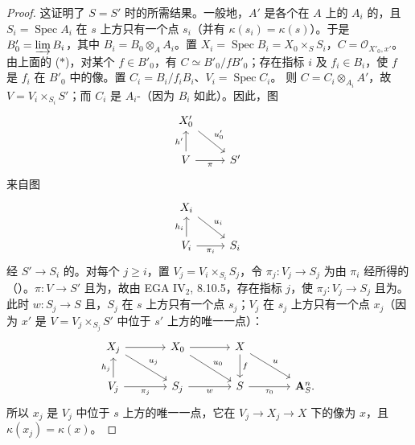 \begin{proof}
这证明了 $S=S'$ 时的所需结果。一般地，$A'$ 是各个在 $A$ 上的 $A_i$ 的，且 $S_i=\operatorname{Spec}A_i$ 在 $s$ 上方只有一个点 $s_i$（并有 $\kappa(s_i)=\kappa(s)$）。于是 $B'_0=\varinjlim B_i$，其中 $B_i=B_0\otimes_AA_i$。置 $X_i=\operatorname{Spec}B_i=X_0\times_SS_i$，$C=\mathcal O_{X'_0,x'}$。由上面的 ($*$)，对某个 $f\in B'_0$，有 $C\simeq B'_0/fB'_0$；存在指标 $i$ 及 $f_i\in B_i$，使 $f$ 是 $f_i$ 在 $B'_0$ 中的像。置 $C_i=B_i/f_iB_i$、$V_i=\operatorname{Spec}C_i$。
则 $C=C_i\otimes_{A_i}A'$，故 $V=V_i\times_{S_i}S'$；而 $C_i$ 是 $A_i$-（因为 $B_i$ 如此）。因此，图
\[
\begin{tikzcd}
X'_0\arrow[dr,"u'_0"]&\\
V\arrow[u,"h'"]\arrow[r,"\pi"']&S'
\end{tikzcd}
\]
来自图
\[
\begin{tikzcd}
X_i\arrow[dr,"u_i"]&\\
V_i\arrow[u,"h_i"]\arrow[r,"\pi_i"']&S_i
\end{tikzcd}
\]
经 $S'\to S_i$ 的。对每个 $j\geq i$，置 $V_j=V_i\times_{S_i}S_j$，令 $\pi_j:V_j\to S_j$ 为由 $\pi_i$ 经所得的（）。$\pi:V\to S'$ 且为，故由 EGA IV$_2$, 8.10.5，存在指标 $j$，使 $\pi_j:V_j\to S_j$ 且为。此时 $w:S_j\to S$ 且，$S_j$ 在 $s$ 上方只有一个点 $s_j$；$V_j$ 在 $s_j$ 上方只有一个点 $x_j$（因为 $x'$ 是 $V=V_j\times_{S_j}S'$ 中位于 $s'$ 上方的唯一一点）：
\[
\begin{tikzcd}[column sep=large]
X_j\arrow[r]\arrow[dr,"u_j"]&X_0\arrow[r]\arrow[dr,"u_0"]&X\arrow[d,"f"]\arrow[dr,"u"]&\\
V_j\arrow[u,"h_j"]\arrow[r,"\pi_j"']&S_j\arrow[r,"w"']&S\arrow[r,"\tau_0"']&\mathbf A_S^n.
\end{tikzcd}
\]
所以 $x_j$ 是 $V_j$ 中位于 $s$ 上方的唯一一点，它在 $V_j\to X_j\to X$ 下的像为 $x$，且 $\kappa(x_j)=\kappa(x)$。
\end{proof}
